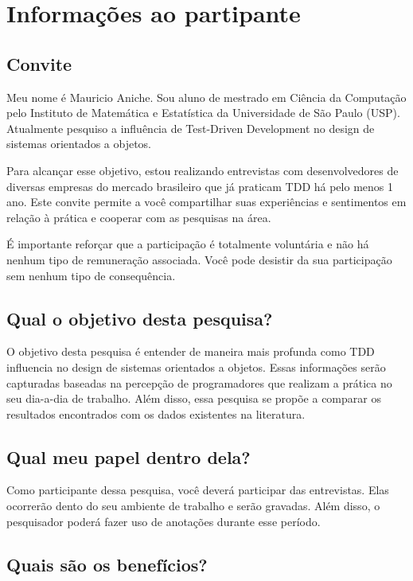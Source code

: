 \chapter{Informações ao partipante}
\label{ape:informacoes-participante}

\section{Convite}

Meu nome é Mauricio Aniche. Sou aluno de mestrado em Ciência da Computação pelo
Instituto de Matemática e Estatística da Universidade de São Paulo (USP).
Atualmente pesquiso a influência de Test-Driven Development no design de
sistemas orientados a objetos.

Para alcançar esse objetivo, estou realizando entrevistas com desenvolvedores de
diversas empresas do mercado brasileiro que já praticam TDD há pelo menos 1 ano.
Este convite permite a você compartilhar suas experiências e sentimentos em
relação à prática e cooperar com as pesquisas na área.

É importante reforçar que a participação é totalmente voluntária e não há nenhum
tipo de remuneração associada. Você pode desistir da sua participação sem nenhum
tipo de consequência.

\section{Qual o objetivo desta pesquisa?}

O objetivo desta pesquisa é entender de maneira mais profunda como TDD
influencia no design de sistemas orientados a objetos. Essas informações serão
capturadas baseadas na percepção de programadores que realizam a prática no seu
dia-a-dia de trabalho. Além disso, essa pesquisa se propõe a comparar os
resultados encontrados com os dados existentes na literatura.

\section{Qual meu papel dentro dela?}

Como participante dessa pesquisa, você deverá participar das entrevistas. Elas
ocorrerão dento do seu ambiente de trabalho e serão gravadas. Além disso, o
pesquisador poderá fazer uso de anotações durante esse período.

\section{Quais são os benefícios?}

